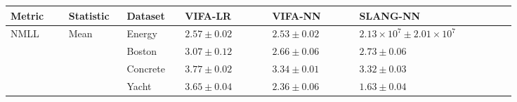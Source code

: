 \documentclass[msc,deptreport.inf]{infthesis} %
\begin{document}
\begin{table}[h!]
	\begin{center}
		\begin{tabular}{|| p{0.10\linewidth} p{0.10\linewidth} p{0.10\linewidth}  p{0.15\linewidth} p{0.15\linewidth} p{0.27\linewidth} ||} 
 			\hline
 			Metric & Statistic & Dataset & VIFA-LR & VIFA-NN & SLANG-NN \\ [0.5ex] 
 			\hline\hline
			NMLL 	& Mean 	& Energy 		& $\mathbf{2.57 \pm 0.02}$ 	& $\mathbf{2.53 \pm 0.02}$ 	& $2.13 \times 10^{7} \pm 2.01 \times 10^{7}$ \\ 	
					&   		& Boston   	& $3.07 \pm 0.12$			& $\mathbf{2.66 \pm 0.06}$ 	& $\mathbf{2.73 \pm 0.06}$ \\ 			
					&   		& Concrete	& $3.77 \pm 0.02$ 			& $\mathbf{3.34 \pm 0.01}$ 	& $\mathbf{3.32 \pm 0.03}$ \\ 			
 					&  		& Yacht    		& $3.65 \pm 0.04$ 			& $2.36 \pm 0.06$ 			& $\mathbf{1.63 \pm 0.04}$ \\
					

\end{tabular}
\end{center}
\end{table}
\end{document}
